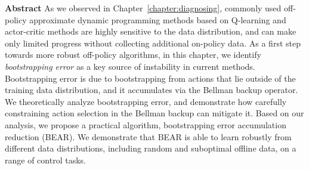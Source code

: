 \documentclass[../thesis.tex]{subfiles}
\begin{document}

\vspace{-0.4cm}
\begin{AIbox}{\large{\textbf{Abstract}}}
\vspace{4mm}
As we observed in Chapter~\ref{chapter:diagnosing}, commonly used off-policy approximate dynamic programming methods based on Q-learning and actor-critic methods are highly sensitive to the data distribution, and can make only limited progress without collecting additional on-policy data. As a first step towards more robust off-policy algorithms, in this chapter, we identify \emph{bootstrapping error} as a key source of instability in current methods. Bootstrapping error is due to bootstrapping from actions that lie outside of the training data distribution, and it accumulates via the Bellman backup operator. We theoretically analyze bootstrapping error, and demonstrate how carefully constraining action selection in the Bellman backup can mitigate it. Based on our analysis, we propose a practical algorithm, bootstrapping error accumulation reduction (BEAR). We demonstrate that BEAR is able to learn robustly from different data distributions, including random and suboptimal offline data, on a range of control tasks.

\end{AIbox}
\end{document}
